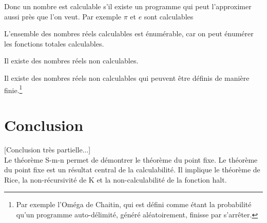 \begin{myrem}
	Donc un nombre est calculable s'il existe un programme qui peut
	l'approximer aussi près que l'on veut. Par exemple $\pi$ et $e$ sont
	calculables
\end{myrem}

\begin{myprop}
	L'ensemble des nombres réels calculables est énumérable, car on peut énumérer les
	fonctions totales calculables.
\end{myprop}

\begin{myprop}
	Il existe des nombres réels non calculables.
\end{myprop}

\begin{myprop}
	Il existe des nombres réels non calculables qui peuvent être définis de
	manière finie.\footnote{Par exemple l'Oméga de Chaitin, qui est défini comme étant la probabilité qu’un programme auto-délimité, généré aléatoirement, finisse par s'arrêter.}
\end{myprop}


\section{Conclusion}
[Conclusion très partielle...]\\
Le théorème S-m-n permet de démontrer le théorème du point fixe.
Le théorème du point fixe est un résultat central de la calculabilité. Il
implique le théorème de Rice, la non-récursivité de K et la non-calculabilité
de la fonction halt.

